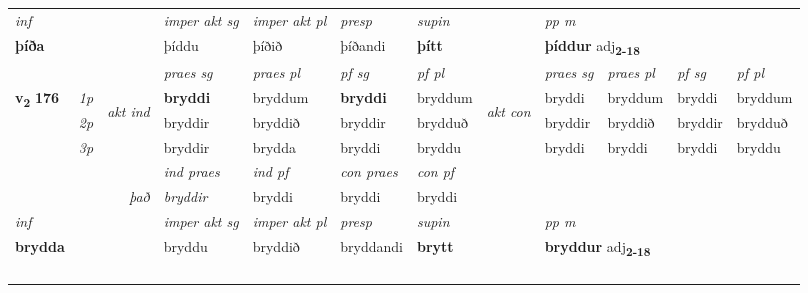 \begin{longtable}[l]{X>{\footnotesize\itshape}llXXXXlXXXX}
\cmidrule{4-7}
   {\textit{inf}} & &  & \textit{imper akt sg} & \textit{imper akt pl}   & \textit{presp} & \textit{supin}  && \textit{pp m} \\*
  {\textbf{þíða}} & && þíddu  & þíðið   & þíðandi &  \textbf{þítt}  && \multicolumn{2}{l}{\textbf{þíddur} adj\textbf{\textsubscript{2-18}}} \\*

\midrule

 & &   & \textit{praes sg}  & \textit{praes pl}    & \textit{ pf sg} & \textit{pf pl} & & \textit{praes sg}  & \textit{praes pl}    & \textit{pf sg} & \textit{pf pl }  \\ \cmidrule{4-7} \cmidrule{9-12}
 \multirow{2}{*}{{{\textbf{v{\textsubscript{2}}} \Large{\textbf{176}}}}}  & 1p & \multirow{3}{*}{\begin{turn}{90}\textit{akt ind}\end{turn}} & \textbf{bryddi} & bryddum & \textbf{bryddi} & bryddum & \multirow{3}{*}{\begin{turn}{90}\textit{akt con}\end{turn}} &bryddi & bryddum & bryddi & bryddum\\*
 & 2p &  &  bryddir  & bryddið & bryddir & brydduð & & bryddir & bryddið & bryddir & brydduð \\*
 & 3p &  & bryddir & brydda & bryddi & bryddu & & bryddi & bryddi& bryddi & bryddu \\*
\cmidrule{4-7} \cmidrule{9-12}

   && &  \textit{ind praes} & \textit{ind pf} & \textit{con praes} & \textit{con pf} \\*
\multicolumn{3}{r}{\textit{það}} & bryddir & bryddi & bryddi & bryddi \\*

\cmidrule{4-7}
   {\textit{inf}} & &  & \textit{imper akt sg} & \textit{imper akt pl}   & \textit{presp} & \textit{supin}  && \textit{pp m} \\*
  {\textbf{brydda}} & && bryddu  & bryddið   & bryddandi &  \textbf{brytt}  && \multicolumn{2}{l}{\textbf{bryddur} adj\textbf{\textsubscript{2-18}}} \\*

\midrule
  & \\*
    & \\*
   & \\*
  & \\
   \midrule


\end{longtable}
